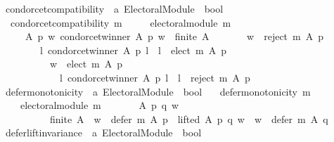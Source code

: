 \begin{isabellebody}
\isanewline
{}\isamarkupfalse%
\ condorcet{\isacharunderscore}{\kern0pt}compatibility\ {\isacharcolon}{\kern0pt}{\isacharcolon}{\kern0pt}\ {\isachardoublequoteopen}{\isacharprime}{\kern0pt}a\ Electoral{\isacharunderscore}{\kern0pt}Module\ {\isasymRightarrow}\ bool{\isachardoublequoteclose}\ \isanewline
\ \ {\isachardoublequoteopen}condorcet{\isacharunderscore}{\kern0pt}compatibility\ m\ {\isasymequiv}\isanewline
\ \ \ \ electoral{\isacharunderscore}{\kern0pt}module\ m\ {\isasymand}\isanewline
\ \ \ \ {\isacharparenleft}{\kern0pt}{\isasymforall}\ A\ p\ w{\isachardot}{\kern0pt}\ condorcet{\isacharunderscore}{\kern0pt}winner\ A\ p\ w\ {\isasymand}\ finite\ A\ {\isasymlongrightarrow}\isanewline
\ \ \ \ \ \ {\isacharparenleft}{\kern0pt}w\ {\isasymnotin}\ reject\ m\ A\ p\ {\isasymand}\isanewline
\ \ \ \ \ \ \ \ {\isacharparenleft}{\kern0pt}{\isasymforall}l{\isachardot}{\kern0pt}\ {\isasymnot}condorcet{\isacharunderscore}{\kern0pt}winner\ A\ p\ l\ {\isasymlongrightarrow}\ l\ {\isasymnotin}\ elect\ m\ A\ p{\isacharparenright}{\kern0pt}\ {\isasymand}\isanewline
\ \ \ \ \ \ \ \ \ \ {\isacharparenleft}{\kern0pt}w\ {\isasymin}\ elect\ m\ A\ p\ {\isasymlongrightarrow}\isanewline
\ \ \ \ \ \ \ \ \ \ \ \ {\isacharparenleft}{\kern0pt}{\isasymforall}l{\isachardot}{\kern0pt}\ {\isasymnot}condorcet{\isacharunderscore}{\kern0pt}winner\ A\ p\ l\ {\isasymlongrightarrow}\ l\ {\isasymin}\ reject\ m\ A\ p{\isacharparenright}{\kern0pt}{\isacharparenright}{\kern0pt}{\isacharparenright}{\kern0pt}{\isacharparenright}{\kern0pt}{\isachardoublequoteclose}\isanewline
\isanewline
\isanewline
{}\isamarkupfalse%
\ defer{\isacharunderscore}{\kern0pt}monotonicity\ {\isacharcolon}{\kern0pt}{\isacharcolon}{\kern0pt}\ {\isachardoublequoteopen}{\isacharprime}{\kern0pt}a\ Electoral{\isacharunderscore}{\kern0pt}Module\ {\isasymRightarrow}\ bool{\isachardoublequoteclose}\ \isanewline
\ \ {\isachardoublequoteopen}defer{\isacharunderscore}{\kern0pt}monotonicity\ m\ {\isasymequiv}\isanewline
\ \ \ \ electoral{\isacharunderscore}{\kern0pt}module\ m\ {\isasymand}\isanewline
\ \ \ \ \ \ {\isacharparenleft}{\kern0pt}{\isasymforall}A\ p\ q\ w{\isachardot}{\kern0pt}\isanewline
\ \ \ \ \ \ \ \ \ \ {\isacharparenleft}{\kern0pt}finite\ A\ {\isasymand}\ w\ {\isasymin}\ defer\ m\ A\ p\ {\isasymand}\ lifted\ A\ p\ q\ w{\isacharparenright}{\kern0pt}\ {\isasymlongrightarrow}\ w\ {\isasymin}\ defer\ m\ A\ q{\isacharparenright}{\kern0pt}{\isachardoublequoteclose}\isanewline
\isanewline
\isanewline
{}\isamarkupfalse%
\ defer{\isacharunderscore}{\kern0pt}lift{\isacharunderscore}{\kern0pt}invariance\ {\isacharcolon}{\kern0pt}{\isacharcolon}{\kern0pt}\ {\isachardoublequoteopen}{\isacharprime}{\kern0pt}a\ Electoral{\isacharunderscore}{\kern0pt}Module\ {\isasymRightarrow}\ bool{\isachardoublequoteclose}\ \isanewline

\end{isabellebody}
